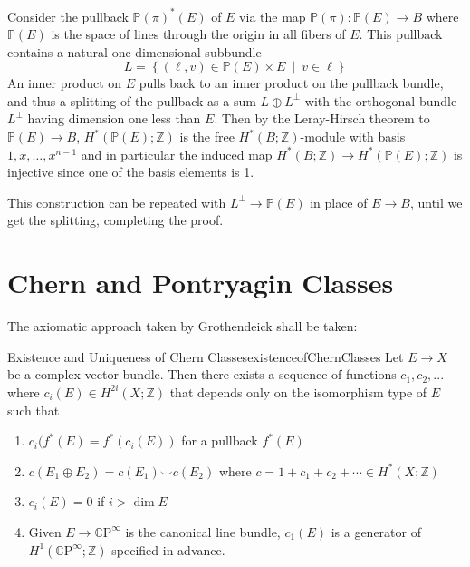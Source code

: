 \documentclass{book}
\newcommand{\Z}{{\mathbb{Z}}}
\renewcommand{\P}{{\mathbb{P}}}
\newcommand{\CP}{\mathbb{C}\mathrm{P}}
\newcommand{\set}[2]{\left\{#1 \ \middle|\ #2\right\}}
\begin{document}
\begin{Proof}
	Consider the pullback $\P(\pi)^*(E)$ of $E$ via the map $\P(\pi):\P(E) \to B$ where $\P(E)$ is the space of
	lines through the origin in all fibers of $E$. This pullback contains a natural one-dimensional subbundle
	\[
		L = \set{(\ell,v) \in \P(E) \times E}{v \in \ell}
	\]
	An inner product on $E$ pulls back to an inner product on the pullback bundle, and thus a splitting of
	the pullback as a sum $L \oplus L^\perp$ with the orthogonal bundle $L^\perp$ having dimension one less
	than $E$. Then by the Leray-Hirsch theorem to $\P(E) \to B$, $H^*(\P(E);\Z)$
	is the free $H^*(B;\Z)$-module with basis $1,x,\ldots,x^{n-1}$ and in particular the induced map
	$H^*(B;\Z) \to H^*(\P(E);\Z)$ is injective since one of the basis elements is 1.

	This construction can be repeated with $L^\perp \to \P(E)$ in place of $E \to B$, until we get the
	splitting, completing the proof.
\end{Proof}

\section{Chern and Pontryagin Classes}

The axiomatic approach taken by Grothendeick shall be taken:

\begin{thm}{Existence and Uniqueness of Chern Classes}{existenceofChernClasses}
	Let $E \to X$ be a complex vector bundle. Then there exists a sequence of functions $c_1, c_2, ...$ where
	$c_i(E) \in H^{2i}(X; \Z)$ that depends only on the isomorphism type of $E$ such that
	\begin{enumerate}
		\item $c_i(f^*(E) = f^*(c_i(E))$ for a pullback $f^*(E)$
		\item $c(E_1\oplus E_2) = c(E_1)\smile c(E_2)$ where $c = 1 + c_1 + c_2 + \cdots \in H^*(X;\Z)$
		\item $c_i(E) = 0$ if $i > \dim E$
		\item Given $E \to \CP^\infty$ is the canonical line bundle, $c_1(E)$ is a generator of
			$H^1(\CP^\infty; \Z)$ specified in advance.
	\end{enumerate}
\end{thm}
\end{document}
